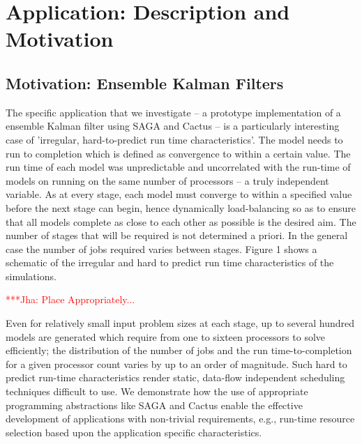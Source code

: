 \documentclass[conference,final]{IEEEtran}
\newcommand{\jhanote}[1]{ {\textcolor{red} { ***Jha: #1 }}}
\begin{document}
\section{Application: Description and Motivation} 

\subsection{Motivation: Ensemble Kalman Filters}

The specific application that we investigate -- a prototype
implementation of a ensemble Kalman filter using SAGA and Cactus -- is
a particularly interesting case of 'irregular, hard-to-predict run
time characteristics'.  The model needs to run to completion which is
defined as convergence to within a certain value.  The run time of
each model was unpredictable and uncorrelated with the run-time of
models on running on the same number of processors -- a truly
independent variable.  As at every stage, each model must converge to
within a specified value before the next stage can begin, hence
dynamically load-balancing so as to ensure that all models complete as
close to each other as possible is the desired aim.  The number of
stages that will be required is not determined a priori. In the
general case the number of jobs required varies between stages.
Figure 1 shows a schematic of the irregular and hard to predict run
time characteristics of the simulations.

\jhanote{Place Appropriately...}

Even for relatively small input problem sizes at each stage, up to
several hundred models are generated which require from one to sixteen
processors to solve efficiently; the distribution of the number of
jobs and the run time-to-completion for a given processor count varies
by up to an order of magnitude.  Such hard to predict run-time
characteristics render static, data-flow independent scheduling
techniques difficult to use.  We demonstrate how the use of
appropriate programming abstractions like SAGA and Cactus enable the
effective development of applications with non-trivial requirements,
e.g., run-time resource selection based upon the application specific
characteristics.


\end{document}
